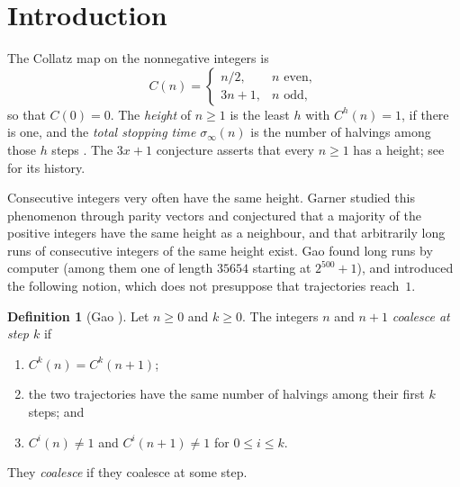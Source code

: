 \documentclass[11pt]{amsart}
\theoremstyle{definition}
\newtheorem{definition}[theorem]{Definition}
\theoremstyle{remark}
\begin{document}
\maketitle

\section{Introduction}

The Collatz map on the nonnegative integers is
\[
C(n)=\begin{cases} n/2, & n \text{ even},\\ 3n+1, & n \text{ odd},\end{cases}
\]
so that $C(0)=0$. The \emph{height} of $n\ge 1$ is the least $h$ with $C^{h}(n)=1$, if there is one, and the \emph{total stopping time} $\sigma_\infty(n)$ is the number of halvings among those $h$ steps \cite{Gao93}. The $3x+1$ conjecture asserts that every $n\ge1$ has a height; see \cite{Lag85,Lag10} for its history.

Consecutive integers very often have the same height. Garner \cite{Gar85} studied this phenomenon through parity vectors and conjectured that a majority of the positive integers have the same height as a neighbour, and that arbitrarily long runs of consecutive integers of the same height exist. Gao \cite{Gao93} found long runs by computer (among them one of length $35654$ starting at $2^{500}+1$), and introduced the following notion, which does not presuppose that trajectories reach~$1$.

\begin{definition}[Gao {\cite[p.~264]{Gao93}}]\label{def:coalesce}
Let $n\ge 0$ and $k\ge0$. The integers $n$ and $n+1$ \emph{coalesce at step $k$} if
\begin{enumerate}
\item $C^{k}(n)=C^{k}(n+1)$;
\item the two trajectories have the same number of halvings among their first $k$ steps; and
\item $C^{i}(n)\ne1$ and $C^{i}(n+1)\ne1$ for $0\le i\le k$.
\end{enumerate}
They \emph{coalesce} if they coalesce at some step.
\end{definition}
\end{document}
